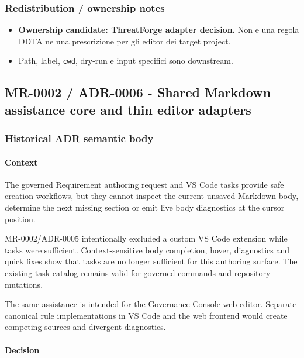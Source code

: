 \documentclass[
  10pt,
]{article}
\providecommand{\tightlist}{%
  \setlength{\itemsep}{0pt}\setlength{\parskip}{0pt}}
\begin{document}
\subsubsection{Redistribution / ownership
notes}\label{redistribution-ownership-notes-13}

\begin{itemize}
\tightlist
\item
  \textbf{Ownership candidate: ThreatForge adapter decision.} Non e una
  regola DDTA ne una prescrizione per gli editor dei target project.
\item
  Path, label, \texttt{cwd}, dry-run e input specifici sono downstream.
\end{itemize}

\subsection{MR-0002 / ADR-0006 - Shared Markdown assistance core and
thin editor
adapters}\label{mr-0002-adr-0006---shared-markdown-assistance-core-and-thin-editor-adapters}

\subsubsection{Historical ADR semantic
body}\label{historical-adr-semantic-body-14}

\paragraph{Context}\label{context-28}

The governed Requirement authoring request and VS Code tasks provide
safe creation workflows, but they cannot inspect the current unsaved
Markdown body, determine the next missing section or emit live body
diagnostics at the cursor position.

MR-0002/ADR-0005 intentionally excluded a custom VS Code extension while
tasks were sufficient. Context-sensitive body completion, hover,
diagnostics and quick fixes show that tasks are no longer sufficient for
this authoring surface. The existing task catalog remains valid for
governed commands and repository mutations.

The same assistance is intended for the Governance Console web editor.
Separate canonical rule implementations in VS Code and the web frontend
would create competing sources and divergent diagnostics.

\paragraph{Decision}\label{decision-28}
\end{document}

